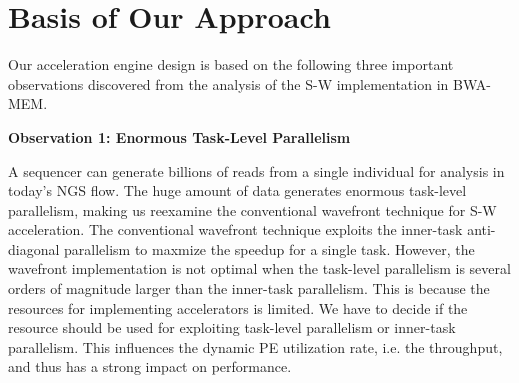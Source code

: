 \section{Basis of Our Approach}
\label{sec:approach}

Our acceleration engine design is based on the following three important observations 
discovered from the analysis of the S-W implementation in BWA-MEM.

\vspace{1pt}
\textbf{Observation 1: Enormous Task-Level Parallelism}
\vspace{1pt}

A sequencer can generate billions of reads from a single individual for analysis in today's NGS flow.
The huge amount of data generates enormous task-level parallelism, making us reexamine the conventional wavefront technique for S-W acceleration.
The conventional wavefront technique exploits the inner-task anti-diagonal parallelism to maxmize the speedup for a single task.
However, the wavefront implementation is not optimal when the task-level parallelism is several orders of magnitude larger than the inner-task parallelism.
This is because the resources for implementing accelerators is limited.
We have to decide if the resource should be used for exploiting task-level parallelism or inner-task parallelism.
This influences the dynamic PE utilization rate, i.e. the throughput, and thus has a strong impact on performance.

